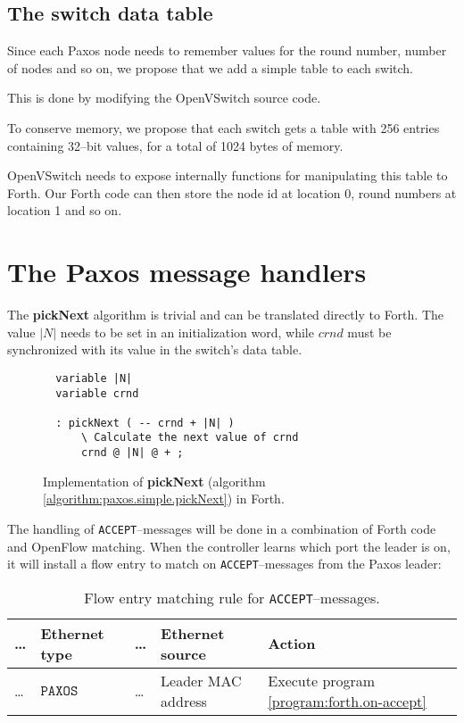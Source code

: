 \subsection{The switch data table}

Since each Paxos node needs to remember values for the round number, number
of nodes and so on, we propose that we add a simple table to each switch.

This is done by modifying the OpenVSwitch source code.

To conserve memory, we propose that each switch gets a table with 256
entries containing 32--bit values, for a total of 1024 bytes of memory.

OpenVSwitch needs to expose internally functions for manipulating this table
to Forth.  Our Forth code can then store the node id at location 0, round
numbers at location 1 and so on.

\section{The Paxos message handlers}

The \textbf{pickNext} algorithm is trivial and can be translated directly to
Forth.  The value $|N|$ needs to be set in an initialization word,
while $crnd$ must be synchronized with its value in the switch's data table.

\begin{figure}[H]
  \centering
  \begin{Verbatim}
  variable |N|
  variable crnd

  : pickNext ( -- crnd + |N| )
      \ Calculate the next value of crnd
      crnd @ |N| @ + ;
  \end{Verbatim}
  \caption{Implementation of \textbf{pickNext} (algorithm
      \ref{algorithm:paxos.simple.pickNext}) in Forth.}
  \label{program.forth.pickNext}
\end{figure}

The handling of \texttt{ACCEPT}--messages will be done in a combination of
Forth code and OpenFlow matching.  When the controller learns which port the
leader is on, it will install a flow entry to match on
\texttt{ACCEPT}--messages from the Paxos leader:

\begin{table}[H]
  \centering
  \begin{tabular}{l|l|l|l|l|}
    \hline
      \dots &
      \textbf{Ethernet type} &
      \dots &
      \textbf{Ethernet source} &
      \textbf{Action}
      \\
    \hline
      \dots &
      $\texttt{PAXOS ACCEPT}$
      & \dots
      & Leader MAC address
      & Execute program \ref{program:forth.on-accept}
      \\
    \hline
  \end{tabular}
  \caption{Flow entry matching rule for \texttt{ACCEPT}--messages.}
  \label{table:matching.simple.accept}
\end{table}

